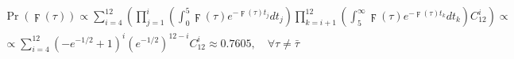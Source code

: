 \documentclass[leqno,a4paper]{article}
\begin{document}
\newcommand{\myf}{\digamma\left(\tau\right)}

\newcommand{\myef}[1]{\myf e^{-\myf t_#1}dt_#1}

\newcommand{\myeh}{e^{-1/2}}

\begin{multline}
\Pr\left(\myf\right) \propto \sum_{i=4}^{12}\left(\prod_{j=1}^i\left(\int_0^5 \myef{j}\right)\prod_{k=i+1}^{12}\left(\int_5^\infty\myef{k}\right)C_{12}^i\right)\propto\\
\propto\sum_{i=4}^{12}\left(-\myeh+1\right)^i\left(\myeh\right)^{12-i}C_{12}^i \approx 0.7605, \quad \forall \tau \ne \bar\tau\quad\quad\quad
\end{multline}
\end{document}
